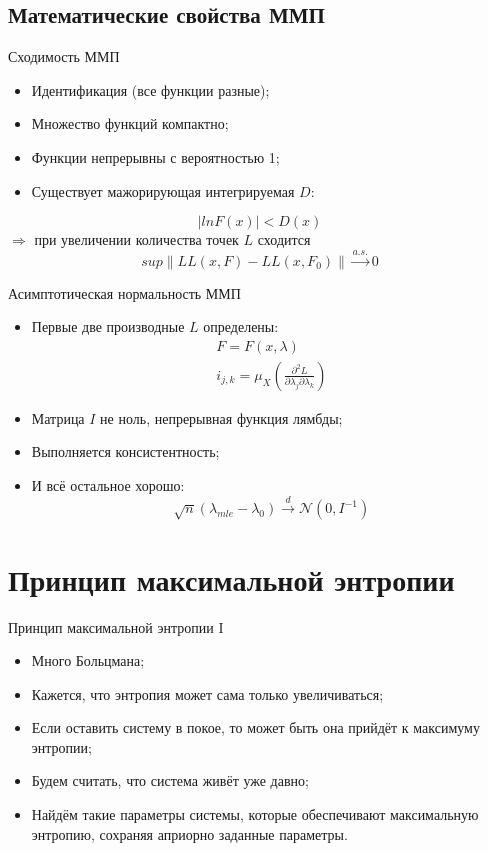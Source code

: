 \documentclass[14pt, fleqn, xcolor={dvipsnames, table}]{beamer}
\begin{document}
\subsection{Математические свойства ММП}

\begin{frame}{Сходимость ММП}
\begin{itemize}
  \item Идентификация (все функции разные);
  \item Множество функций компактно;
  \item Функции непрерывны с вероятностью 1;
  \item Существует мажорирующая интегрируемая $D$:
\end{itemize}
  $$
  | ln F(x) | < D(x)
  $$
  $\Longrightarrow$ при увеличении количества точек $L$ сходится
  $$
    sup\|LL(x, F) - LL(x, F_0)\| \overset{a.s.}{\to} 0
  $$
\end{frame}

\begin{frame}{Асимптотическая нормальность ММП}
\begin{itemize}
  \item Первые две производные $L$ определены:
  $$\begin{array}{l}
    F = F(x, \lambda) \\
    i_{j,k} = \mu_X(\frac{\partial^2L}{\partial\lambda_j\partial\lambda_k})
  \end{array}$$
  \item Матрица $I$ не ноль, непрерывная функция лямбды;
  \item Выполняется консистентность;
  \item И всё остальное хорошо:
  $$
  \sqrt{n}(\lambda_{mle} - \lambda_0) \overset{d}{\to} \mathcal{N}(0, I^{-1})
  $$
\end{itemize}
\end{frame}
\section{Принцип максимальной энтропии}

\begin{frame}{Принцип максимальной энтропии I}
\begin{itemize}
  \item Много Больцмана;
  \item Кажется, что энтропия может сама только увеличиваться;
  \item Если оставить систему в покое, то может быть она прийдёт к максимуму энтропии;
  \item Будем считать, что система живёт уже давно;
  \item Найдём такие параметры системы, которые обеспечивают максимальную энтропию, сохраняя априорно заданные параметры.
\end{itemize}
\end{frame}
\end{document}
